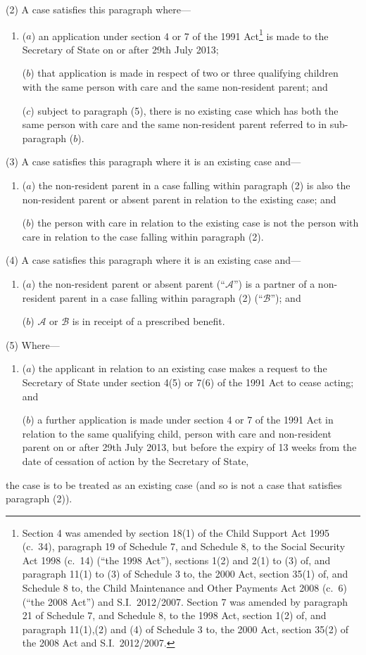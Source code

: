 \documentclass[12pt,a4paper]{article}
\begin{document}
(2) A case satisfies this paragraph where—
\begin{enumerate}\item[]
($a$) an application under section 4 or 7 of the 1991 Act\footnote{Section 4 was amended by section 18(1) of the Child Support Act 1995 (c.~34), paragraph 19 of Schedule 7, and Schedule 8, to the Social Security Act 1998 (c.~14) (“the 1998 Act”), sections 1(2) and 2(1) to (3) of, and paragraph 11(1) to (3) of Schedule 3 to, the 2000 Act, section 35(1) of, and Schedule 8 to, the Child Maintenance and Other Payments Act 2008 (c.~6) (“the 2008 Act”) and S.I.~2012/2007. Section 7 was amended by paragraph 21 of Schedule 7, and Schedule 8, to the 1998 Act, section 1(2) of, and paragraph 11(1),(2) and (4) of Schedule 3 to, the 2000 Act, section 35(2) of the 2008 Act and S.I.~2012/2007.} is made to the Secretary of State on or after 29th July 2013;

($b$) that application is made in respect of two or three qualifying children with the same person with care and the same non-resident parent; and

($c$) subject to paragraph (5), there is no existing case which has both the same person with care and the same non-resident parent referred to in sub-paragraph ($b$).
\end{enumerate}

(3) A case satisfies this paragraph where it is an existing case and—
\begin{enumerate}\item[]
($a$) the non-resident parent in a case falling within paragraph (2) is also the non-resident parent or absent parent in relation to the existing case; and

($b$) the person with care in relation to the existing case is not the person with care in relation to the case falling within paragraph (2).
\end{enumerate}

(4) A case satisfies this paragraph where it is an existing case and—
\begin{enumerate}\item[]
($a$) the non-resident parent or absent parent (“$\mathcal{A}$”) is a partner of a non-resident parent in a case falling within paragraph (2) (“$\mathcal{B}$”); and

($b$) $\mathcal{A}$ or $\mathcal{B}$ is in receipt of a prescribed benefit.
\end{enumerate}

(5) Where—
\begin{enumerate}\item[]
($a$) the applicant in relation to an existing case makes a request to the Secretary of State under section 4(5) or 7(6) of the 1991 Act to cease acting; and

($b$) a further application is made under section 4 or 7 of the 1991 Act in relation to the same qualifying child, person with care and non-resident parent on or after 29th July 2013, but before the expiry of 13 weeks from the date of cessation of action by the Secretary of State,
\end{enumerate}
the case is to be treated as an existing case (and so is not a case that satisfies paragraph (2)).
\end{document}
